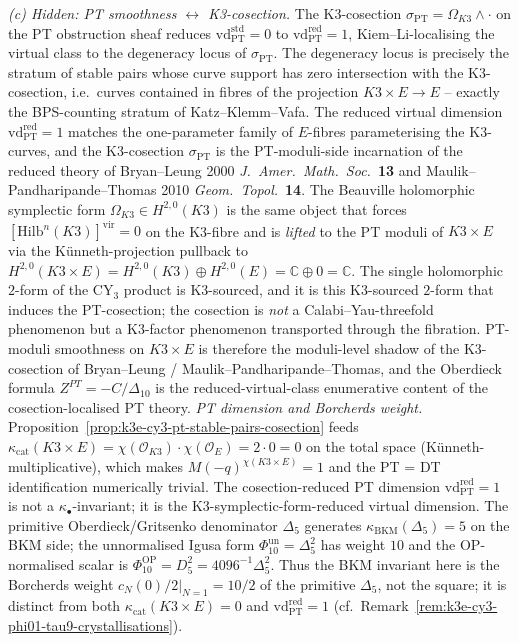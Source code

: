 \begin{remark}[PT/DT at \texorpdfstring{$\chi = 0$}{chi = 0}: naive-ratio killed, cosection-reduction surviving, K3-fibre hidden-pattern]
\emph{(c) Hidden: PT smoothness $\leftrightarrow$ K3-cosection.} The K3-cosection $\sigma_{\mathrm{PT}} = \Omega_{K3}\wedge\cdot$ on the PT obstruction sheaf reduces $\mathrm{vd}^{\mathrm{std}}_{\mathrm{PT}} = 0$ to $\mathrm{vd}^{\mathrm{red}}_{\mathrm{PT}} = 1$, Kiem--Li-localising the virtual class to the degeneracy locus of $\sigma_{\mathrm{PT}}$. The degeneracy locus is precisely the stratum of stable pairs whose curve support has zero intersection with the K3-cosection, i.e.\ curves contained in fibres of the projection $K3\times E\to E$ -- exactly the BPS-counting stratum of Katz--Klemm--Vafa. The reduced virtual dimension $\mathrm{vd}^{\mathrm{red}}_{\mathrm{PT}} = 1$ matches the one-parameter family of $E$-fibres parameterising the K3-curves, and the K3-cosection $\sigma_{\mathrm{PT}}$ is the PT-moduli-side incarnation of the reduced theory of Bryan--Leung 2000 \emph{J.\ Amer.\ Math.\ Soc.}~\textbf{13} and Maulik--Pandharipande--Thomas 2010 \emph{Geom.\ Topol.}~\textbf{14}. The Beauville holomorphic symplectic form $\Omega_{K3}\in H^{2,0}(K3)$ is the same object that forces $[\mathrm{Hilb}^n(K3)]^{\mathrm{vir}} = 0$ on the K3-fibre and is \emph{lifted} to the PT moduli of $K3\times E$ via the K\"unneth-projection pullback to $H^{2,0}(K3\times E) = H^{2,0}(K3)\oplus H^{2,0}(E) = \mathbb C\oplus 0 = \mathbb C$. The single holomorphic $2$-form of the CY$_3$ product is K3-sourced, and it is this K3-sourced $2$-form that induces the PT-cosection; the cosection is \emph{not} a Calabi--Yau-threefold phenomenon but a K3-factor phenomenon transported through the fibration. PT-moduli smoothness on $K3\times E$ is therefore the moduli-level shadow of the K3-cosection of Bryan--Leung / Maulik--Pandharipande--Thomas, and the Oberdieck formula $Z^{PT} = -C/\Delta_{10}$ is the reduced-virtual-class enumerative content of the cosection-localised PT theory.
\emph{PT dimension and Borcherds weight.} Proposition~\ref{prop:k3e-cy3-pt-stable-pairs-cosection} feeds $\kappa_{\mathrm{cat}}(K3\times E) = \chi(\mathcal O_{K3})\cdot\chi(\mathcal O_E) = 2\cdot 0 = 0$ on the total space (K\"unneth-multiplicative), which makes $M(-q)^{\chi(K3\times E)} = 1$ and the PT = DT identification numerically trivial. The cosection-reduced PT dimension $\mathrm{vd}^{\mathrm{red}}_{\mathrm{PT}} = 1$ is not a $\kappa_\bullet$-invariant; it is the K3-symplectic-form-reduced virtual dimension. The primitive Oberdieck/Gritsenko denominator \(\Delta_5\) generates \(\kappa_{\mathrm{BKM}}(\Delta_5) = 5\) on the BKM side; the unnormalised Igusa form \(\Phi_{10}^{\mathrm{un}}=\Delta_5^2\) has weight \(10\) and the OP-normalised scalar is \(\Phi_{10}^{\mathrm{OP}}=D_5^2=4096^{-1}\Delta_5^2\). Thus the BKM invariant here is the Borcherds weight \(\left.c_N(0)/2\right|_{N=1} = 10/2\) of the primitive \(\Delta_5\), not the square; it is distinct from both \(\kappa_{\mathrm{cat}}(K3\times E) = 0\) and \(\mathrm{vd}^{\mathrm{red}}_{\mathrm{PT}} = 1\) (cf.\ Remark~\ref{rem:k3e-cy3-phi01-tau9-crystallisations}).

\end{remark}
